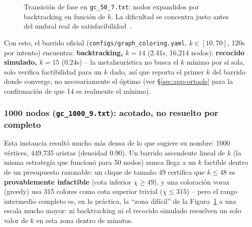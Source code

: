 \documentclass[11pt,onecolumn,letterpaper]{article}
\newcommand{\code}[1]{\texttt{#1}}
\begin{document}
\begin{figure}[H]
\centering
{}
\caption{Transici\'on de fase en \code{gc\_50\_7.txt}: nodos expandidos por backtracking en
funci\'on de $k$. La dificultad se concentra justo antes del umbral real de
satisfacibilidad~\cite{cheeseman1991hard}.}
\label{fig:phase}
\end{figure}

Con esto, el barrido oficial (\code{configs/graph\_coloring.yaml}, $k\in[10,70]$,
120s por intento) encuentra: \textbf{backtracking, $k=14$} (2.41s, 16{,}214 nodos);
\textbf{recocido simulado, $k=15$} (0.24s) -- la metaheur\'istica no busca el $k$ m\'inimo
por s\'i sola, solo verifica factibilidad para un $k$ dado, as\'i que reporta el primer $k$
del barrido donde converge, no necesariamente el \'optimo (ver \S\ref{sec:app-ortools} para
la confirmaci\'on de que 14 es realmente el m\'inimo).

\subsubsection{1000 nodos (\code{gc\_1000\_9.txt}): acotado, no resuelto por completo}

Esta instancia result\'o mucho m\'as densa de lo que sugiere su nombre: 1000 v\'ertices,
449{,}735 aristas (densidad $0.90$). Un barrido ascendente lineal de $k$ (la misma
estrategia que funcion\'o para 50 nodos) nunca llega a un $k$ factible dentro de un
presupuesto razonable: un clique de tama\~no 49 certifica que $k\le48$ es
\textbf{provablemente infactible} (cota inferior $\chi\ge49$), y una coloraci\'on voraz
(greedy) usa 315 colores como cota superior trivial ($\chi\le315$) -- pero el rango
intermedio completo es, en la pr\'actica, la ``zona dif\'icil'' de la
Figura~\ref{fig:phase} a una escala mucho mayor: ni backtracking ni el recocido simulado
resuelven un solo valor de $k$ en esta zona dentro de minutos.
\end{document}

